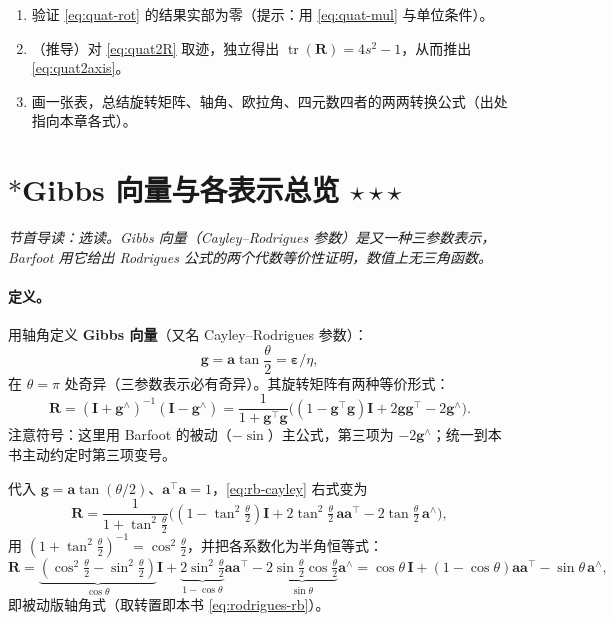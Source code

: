 \begin{practice}
\begin{enumerate}
  \item 验证 \cref{eq:quat-rot} 的结果实部为零（提示：用 \cref{eq:quat-mul} 与单位条件）。
  \item （推导）对 \cref{eq:quat2R} 取迹，独立得出 $\operatorname{tr}(\mathbf{R})=4s^2-1$，从而推出 \cref{eq:quat2axis}。
  \item 画一张表，总结旋转矩阵、轴角、欧拉角、四元数四者的两两转换公式（出处指向本章各式）。
\end{enumerate}
\end{practice}

\section{\texorpdfstring{$*$}{*}Gibbs 向量与各表示总览 \texorpdfstring{$\star\star\star$}{***}}
\label{sec:rb-gibbs}
\noindent\emph{节首导读：选读。Gibbs 向量（Cayley--Rodrigues 参数）是又一种三参数表示，Barfoot 用它给出 Rodrigues 公式的两个代数等价性证明，数值上无三角函数。}

\paragraph{定义。}用轴角定义 \textbf{Gibbs 向量}（又名 Cayley--Rodrigues 参数）：
\begin{equation}
  \mathbf{g}=\mathbf{a}\tan\frac{\theta}{2}=\boldsymbol{\varepsilon}/\eta,
  \label{eq:rb-gibbs}
\end{equation}
在 $\theta=\pi$ 处奇异（三参数表示必有奇异）。其旋转矩阵有两种等价形式\cite{barfoot2024state}：
\begin{equation}
  \mathbf{R}=(\mathbf{I}+\mathbf{g}^\wedge)^{-1}(\mathbf{I}-\mathbf{g}^\wedge)
  =\frac{1}{1+\mathbf{g}^\top\mathbf{g}}\big((1-\mathbf{g}^\top\mathbf{g})\mathbf{I}+2\mathbf{g}\mathbf{g}^\top-2\mathbf{g}^\wedge\big).
  \label{eq:rb-cayley}
\end{equation}
注意符号：这里用 Barfoot 的被动（$-\sin$）主公式，第三项为 $-2\mathbf{g}^\wedge$；统一到本书主动约定时第三项变号。

\begin{derivation}
代入 $\mathbf{g}=\mathbf{a}\tan(\theta/2)$、$\mathbf{a}^\top\mathbf{a}=1$，\cref{eq:rb-cayley} 右式变为
\[
  \mathbf{R}=\frac{1}{1+\tan^2\tfrac{\theta}{2}}\Big((1-\tan^2\tfrac{\theta}{2})\mathbf{I}+2\tan^2\tfrac{\theta}{2}\,\mathbf{a}\mathbf{a}^\top-2\tan\tfrac{\theta}{2}\,\mathbf{a}^\wedge\Big),
\]
用 $(1+\tan^2\tfrac{\theta}{2})^{-1}=\cos^2\tfrac{\theta}{2}$，并把各系数化为半角恒等式：
\[
  \mathbf{R}=\underbrace{(\cos^2\tfrac{\theta}{2}-\sin^2\tfrac{\theta}{2})}_{\cos\theta}\mathbf{I}
  +\underbrace{2\sin^2\tfrac{\theta}{2}}_{1-\cos\theta}\mathbf{a}\mathbf{a}^\top
  -\underbrace{2\sin\tfrac{\theta}{2}\cos\tfrac{\theta}{2}}_{\sin\theta}\mathbf{a}^\wedge
  =\cos\theta\,\mathbf{I}+(1-\cos\theta)\mathbf{a}\mathbf{a}^\top-\sin\theta\,\mathbf{a}^\wedge,
\]
即被动版轴角式（取转置即本书 \cref{eq:rodrigues-rb}）。
\end{derivation}

